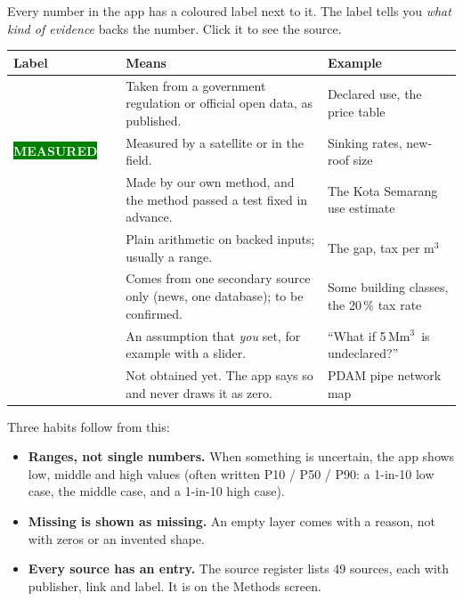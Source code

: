 \documentclass[11pt,a4paper]{article}
\newcommand{\pv}[2]{{\setlength{\fboxsep}{1.3pt}\colorbox{#1}{\textcolor{white}{\sffamily\bfseries\fontsize{6.3}{7}\selectfont #2}}}}
\newcommand{\Off}{\pv{accent}{OFFICIAL}}
\newcommand{\Mea}{\pv{green}{MEASURED}}
\newcommand{\Tst}{\pv{tested}{TESTED}}
\newcommand{\Calc}{\pv{calc}{CALCULATED}}
\newcommand{\Wk}{\pv{weak}{WEAK}}
\newcommand{\Scn}{\pv{scen}{SCENARIO}}
\newcommand{\Mis}{\pv{miss}{MISSING}}
\newcommand{\Mm}{\,Mm$^{3}$}
\newcommand{\mthree}{m$^{3}$}
\begin{document}
\begin{inshort}
Every number in the app has a coloured label next to it. The label tells you \emph{what kind of evidence}
backs the number. Click it to see the source.
\end{inshort}

\begin{center}
\small
\begin{tabularx}{\linewidth}{@{}l Y L{50mm}@{}}
\toprule
\textbf{Label} & \textbf{Means} & \textbf{Example}\\
\midrule
\Off & Taken from a government regulation or official open data, as published. & Declared use, the
  price table\\
\Mea & Measured by a satellite or in the field. & Sinking rates, new-roof size\\
\Tst & Made by our own method, and the method passed a test fixed in advance. & The Kota Semarang use
  estimate\\
\Calc & Plain arithmetic on backed inputs; usually a range. & The gap, tax per \mthree\\
\Wk & Comes from one secondary source only (news, one database); to be confirmed. & Some building
  classes, the 20\,\% tax rate\\
\Scn & An assumption that \emph{you} set, for example with a slider. & ``What if 5\Mm\ is undeclared?''\\
\Mis & Not obtained yet. The app says so and never draws it as zero. & PDAM pipe network map\\
\bottomrule
\end{tabularx}
\end{center}

Three habits follow from this:
\begin{itemize}
\item \textbf{Ranges, not single numbers.} When something is uncertain, the app shows low, middle and high
  values (often written P10 / P50 / P90: a 1-in-10 low case, the middle case, and a 1-in-10 high case).
\item \textbf{Missing is shown as missing.} An empty layer comes with a reason, not with zeros or an
  invented shape.
\item \textbf{Every source has an entry.} The source register lists 49 sources, each with publisher,
  link and label. It is on the Methods screen.
\end{itemize}

\end{document}

